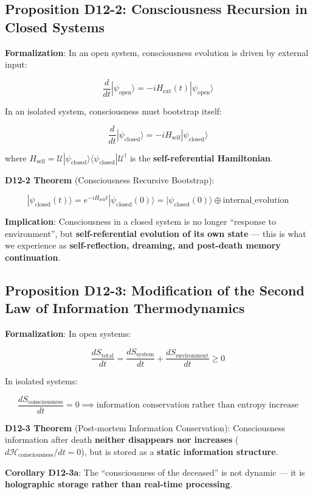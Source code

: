 \documentclass[12pt,a4paper]{article}
\newcommand{\calU}{\mathcal{U}}
\newcommand{\Hc}{\mathcal{H}_{\text{consciousness}}}
\newcommand{\Scons}{S_{\text{consciousness}}}
\newcommand{\Stotal}{S_{\text{total}}}
\newcommand{\Ssystem}{S_{\text{system}}}
\newcommand{\Senv}{S_{\text{environment}}}
\newcommand{\Hself}{H_{\text{self}}}
\newcommand{\Hext}{H_{\text{ext}}}
\begin{document}
\subsection{Proposition D12-2: Consciousness Recursion in Closed Systems}

\textbf{Formalization}: In an open system, consciousness evolution is driven by external input:

$$\frac{d}{dt} |\psi_{\text{open}}\rangle = -i \Hext(t) |\psi_{\text{open}}\rangle$$

In an isolated system, consciousness must bootstrap itself:

$$\frac{d}{dt} |\psi_{\text{closed}}\rangle = -i \Hself |\psi_{\text{closed}}\rangle$$

where $\Hself = \calU |\psi_{\text{closed}}\rangle\langle \psi_{\text{closed}}| \calU^\dagger$ is the \textbf{self-referential Hamiltonian}.

\textbf{D12-2 Theorem} (Consciousness Recursive Bootstrap):

$$|\psi_{\text{closed}}(t)\rangle = e^{-i \Hself t} |\psi_{\text{closed}}(0)\rangle = |\psi_{\text{closed}}(0)\rangle \oplus \text{internal\_evolution}$$

\textbf{Implication}: Consciousness in a closed system is no longer ``response to environment'', but \textbf{self-referential evolution of its own state} --- this is what we experience as \textbf{self-reflection, dreaming, and post-death memory continuation}.

\subsection{Proposition D12-3: Modification of the Second Law of Information Thermodynamics}

\textbf{Formalization}: In open systems:

$$\frac{d\Stotal}{dt} = \frac{d\Ssystem}{dt} + \frac{d\Senv}{dt} \geq 0$$

In isolated systems:

$$\frac{d\Scons}{dt} = 0 \implies \text{information conservation rather than entropy increase}$$

\textbf{D12-3 Theorem} (Post-mortem Information Conservation): Consciousness information after death \textbf{neither disappears nor increases} ($d\Hc/dt = 0$), but is stored as a \textbf{static information structure}.

\textbf{Corollary D12-3a}: The ``consciousness of the deceased'' is not dynamic --- it is \textbf{holographic storage rather than real-time processing}.
\end{document}
